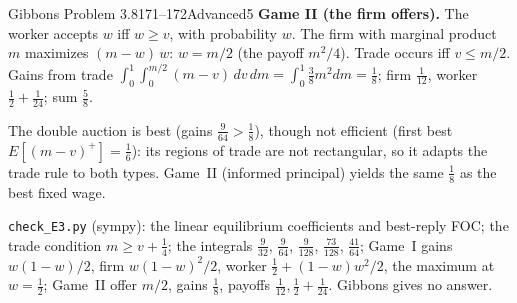 \begin{exsol}{Gibbons Problem 3.8}{171--172}{Advanced}{5}
\textbf{Game II (the firm offers).} The worker accepts $w$ iff $w\ge v$, with probability $w$. The
firm with marginal product $m$ maximizes $(m-w)\,w$: $w=m/2$ (the payoff $m^2/4$). Trade occurs iff
$v\le m/2$. Gains from trade $\int_0^1\!\int_0^{m/2}(m-v)\,dv\,dm=\int_0^1\tfrac38m^2dm=\tfrac18$; firm
$\tfrac1{12}$, worker $\tfrac12+\tfrac1{24}$; sum $\tfrac58$.

\interp The double auction is best (gains $\tfrac9{64}>\tfrac18$), though not efficient (first
best $E[(m-v)^+]=\tfrac16$): its regions of trade are not rectangular, so it adapts the trade
rule to both types. Game~II (informed principal) yields the same $\tfrac18$ as the best fixed wage.

\verify \texttt{check\_E3.py} (sympy): the linear equilibrium coefficients and best-reply FOC; the
trade condition $m\ge v+\tfrac14$; the integrals $\tfrac9{32}$, $\tfrac9{64}$, $\tfrac9{128}$,
$\tfrac{73}{128}$, $\tfrac{41}{64}$; Game~I gains $w(1-w)/2$, firm $w(1-w)^2/2$, worker $\tfrac12+(1-w)w^2/2$, the
maximum at $w=\tfrac12$; Game~II offer $m/2$, gains $\tfrac18$, payoffs $\tfrac1{12},\tfrac12+\tfrac1{24}$. Gibbons gives no
answer.

\end{exsol}
